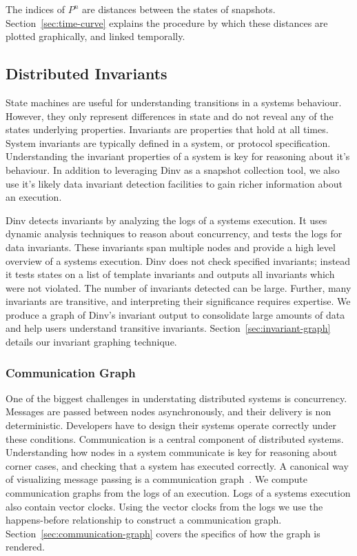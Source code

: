 The indices of $P^n$ are distances between the states of snapshots.
Section~\ref{sec:time-curve} explains the procedure by which these distances are
plotted graphically, and linked temporally.

\subsection{Distributed Invariants}

State machines are useful for understanding transitions in a systems behaviour.
However, they only represent differences in state and do not reveal any of the
states underlying properties. Invariants are properties that hold at all times.
System invariants are typically defined in a system, or protocol specification.
Understanding the invariant properties of a system is key for reasoning about
it's behaviour. In addition to leveraging Dinv as a snapshot collection tool,
we also use it's likely data invariant detection facilities to gain richer information
about an execution.

Dinv detects invariants by analyzing the logs of a systems execution. It uses
dynamic analysis techniques to reason about concurrency, and tests the logs for
data invariants. These invariants span multiple nodes and provide a high level
overview of a systems execution. Dinv does not check specified invariants;
instead it tests states on a list of template  invariants and outputs all
invariants which were not violated. The number of invariants detected can be
large. Further, many invariants are transitive, and interpreting their
significance requires expertise. We produce a graph of Dinv's invariant output
to consolidate large amounts of data and help users understand transitive
invariants. Section~\ref{sec:invariant-graph} details our invariant
graphing technique.

\subsubsection{Communication Graph}

One of the biggest challenges in understating distributed systems is
concurrency. Messages are passed between nodes asynchronously, and their delivery
is non deterministic. Developers have to design their systems operate correctly
under these conditions. Communication is a central component of distributed
systems. Understanding how nodes in a system communicate is key for reasoning
about corner cases, and checking that a system has executed correctly. A
canonical way of visualizing message passing is a communication
graph~\cite{Lamport78,BeschastnikhWBE2016}. We compute communication graphs from the logs of
an execution. Logs of a systems execution also contain vector clocks. Using the
vector clocks from the logs we use the happens-before relationship to construct
a communication graph. Section~\ref{sec:communication-graph} covers the specifics
of how the graph is rendered.
